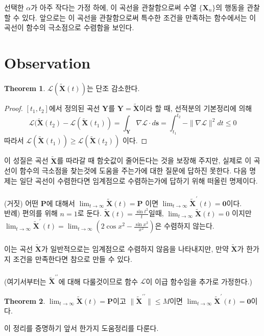 \documentclass[a4paper,20pt]{article}
\theoremstyle{definition}
\newtheorem{theorem}{Theorem}[section]
\newcommand{\limit}[2][\infty]{\lim_{#2 \to #1}}
\newcommand{\curve}[1][X]{\tilde{\mathbf{#1}}}
\begin{document}
선택한 $\alpha$가 아주 작다는 가정 하에, 이 곡선을 관찰함으로써 수열 $\{\mathbf{X}_{n}\}$의 행동을 관찰할 수 있다. 앞으로는 이 곡선을 관찰함으로써 특수한 조건을 만족하는 함수에서는 이 곡선이 함수의 극소점으로 수렴함을 보인다.

\section{Observation}

\begin{theorem}
$\mathcal{L}(\curve(t))$는 단조 감소한다.
\end{theorem}

\begin{proof}
$[t_{1},t_{2}]$에서 정의된 곡선 $\mathbf{Y}$를 $\mathbf{Y}=\curve$이라 할 때, 선적분의 기본정리에 의해
$$ 
\mathcal{L}(\curve(t_{2})-\mathcal{L}(\curve(t_{1}))
= \int_\mathbf{Y} \nabla\mathcal{L} \cdot d\mathbf{s}=\int_{t_{1}}^{t_{2}}-\| \nabla \mathcal{L} \|^{2} dt \leq 0  
$$
따라서 $\mathcal{L}(\curve(t_{1}))\geq\mathcal{L}(\curve(t_{2}))$ 이다. 
\end{proof}

이 성질은 곡선 $\curve$를 따라갈 때 함숫값이 줄어든다는 것을 보장해 주지만, 실제로 이 곡선이 함수의 극소점을 찾는것에 도움을 주는가에 대한 
질문에 답하진 못한다. 다음 명제는 일단 곡선이 수렴한다면 임계점으로 수렴하는가에 답하기 위해 떠올린 명제이다.		
\\\\
(거짓) 어떤 $\mathbf{P}$에 대해서 $\limit{t}\curve(t)=\mathbf{P}$ 이면 
$\limit{t}\curve^{\prime}(t)=\mathbf{0}$이다. \\
반례) 편의를 위해 $n=1$로 둔다. $\curve(t)=\frac{\sin t^{2}}{t}$일때, $\limit{t}\curve(t)=0$ 이지만 
$\limit{t}\curve^{\prime}(t)=\limit{t}(2\cos x^{2}-\frac{\sin x^{2}}{x^{2}})$은 수렴하지 않는다.
\\\\
이는 곡선 $\curve$가 일반적으로는 임계점으로 수렴하지 않음을 나타내지만, 만약 $\curve$가 한가지 조건을 만족한다면 참으로 만들 수 있다.
\\\\
(여기서부터는 $\curve^{\prime \prime}$에 대해 다룰것이므로 함수 $\mathcal{L}$이 이급 함수임을 추가로 가정한다.)
\begin{theorem}
$\limit{t} \curve(t)=\mathbf{P}$이고 $\|\curve^{\prime \prime}\|\leq M$이면 
$\limit{t}\curve^{\prime}(t)=\mathbf{0}$이다.
\end{theorem}

이 정리를 증명하기 앞서 한가지 도움정리를 다룬다.
\end{document}
